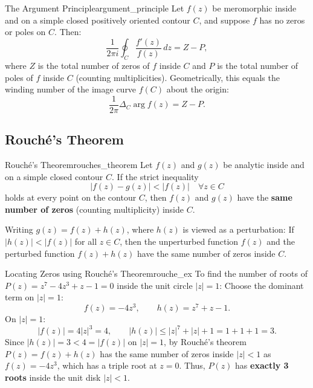 \begin{theorem}{The Argument Principle}{argument_principle}
Let $f(z)$ be meromorphic inside and on a simple closed positively oriented contour $C$, and suppose $f$ has no zeros or poles on $C$.
Then:
\begin{equation}
\frac{1}{2\pi i} \oint_C \frac{f'(z)}{f(z)}\, dz = Z - P,
\end{equation}
where $Z$ is the total number of zeros of $f$ inside $C$ and $P$ is the total number of poles of $f$ inside $C$ (counting multiplicities).
Geometrically, this equals the winding number of the image curve $f(C)$ about the origin:
\begin{equation}
\frac{1}{2\pi} \Delta_C \arg f(z) = Z - P.
\end{equation}
\end{theorem}

\subsection{Rouché's Theorem}

\begin{theorem}{Rouché's Theorem}{rouches_theorem}
Let $f(z)$ and $g(z)$ be analytic inside and on a simple closed contour $C$.
If the strict inequality
\begin{equation}
|f(z) - g(z)| < |f(z)| \quad \forall z \in C
\end{equation}
holds at every point on the contour $C$, then $f(z)$ and $g(z)$ have the \textbf{same number of zeros} (counting multiplicity) inside $C$.
\end{theorem}

\begin{remark}
Writing $g(z) = f(z) + h(z)$, where $h(z)$ is viewed as a perturbation:
If $|h(z)| < |f(z)|$ for all $z \in C$, then the unperturbed function $f(z)$ and the perturbed function $f(z) + h(z)$ have the same number of zeros inside $C$.
\end{remark}

\begin{example}{Locating Zeros using Rouché's Theorem}{rouche_ex}
To find the number of roots of $P(z) = z^7 - 4z^3 + z - 1 = 0$ inside the unit circle $|z| = 1$:
Choose the dominant term on $|z| = 1$:
\begin{equation}
f(z) = -4z^3, \qquad h(z) = z^7 + z - 1.
\end{equation}
On $|z| = 1$:
\begin{equation}
|f(z)| = 4|z|^3 = 4, \qquad |h(z)| \le |z|^7 + |z| + 1 = 1 + 1 + 1 = 3.
\end{equation}
Since $|h(z)| = 3 < 4 = |f(z)|$ on $|z| = 1$, by Rouché's theorem $P(z) = f(z) + h(z)$ has the same number of zeros inside $|z| < 1$ as $f(z) = -4z^3$, which has a triple root at $z = 0$.
Thus, $P(z)$ has \textbf{exactly 3 roots} inside the unit disk $|z| < 1$.
\end{example}
